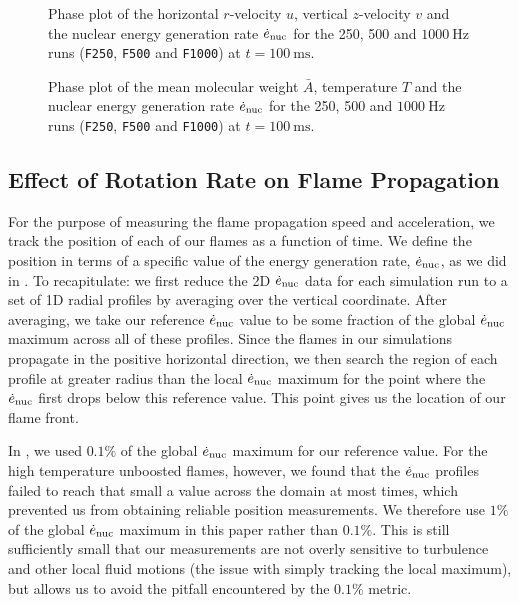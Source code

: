 \documentclass[preprint,times,tighten]{aastex63}
\newcommand{\enucdot}{\dot{e}_{\rm nuc}}
\begin{document}
\begin{figure}[t]
    \centering
    \caption{\label{fig:uv}Phase plot of the horizontal $r$-velocity $u$, vertical $z$-velocity $v$ and the nuclear energy generation rate $\dot{e}_{\rm nuc}$ for the 250, 500 and $1000~\mathrm{Hz}$ runs ({\tt F250}, {\tt F500} and {\tt F1000}) at $t = 100~\mathrm{ms}$.}
\end{figure}

\begin{figure}[t]
    \centering
    \caption{\label{fig:abar}Phase plot of the mean molecular weight $\bar{A}$, temperature $T$ and the nuclear energy generation rate $\dot{e}_{\rm nuc}$ for the 250, 500 and $1000~\mathrm{Hz}$ runs ({\tt F250}, {\tt F500} and {\tt F1000}) at $t = 100~\mathrm{ms}$.}
\end{figure}

\subsection{Effect of Rotation Rate on Flame Propagation}\label{ssec:rot_propagation}

For the purpose of measuring the flame propagation speed and acceleration, we track the position of 
each of our flames as a function of time. We define the position in terms of a specific value of 
the energy generation rate, $\enucdot$, as we did in \citet{flame_wave1}. To recapitulate: we first 
reduce the 2D $\enucdot$ data for each simulation run to a set of 1D radial profiles by averaging
over the vertical coordinate. After averaging, we take our reference $\enucdot$ value to be some 
fraction of the global $\enucdot$ maximum across all of these profiles. Since the flames in our 
simulations propagate in the positive horizontal direction, we then search the region of each profile 
at greater radius than the local $\enucdot$ maximum for the point where the $\enucdot$ first drops 
below this reference value. This point gives us the location of our flame front.

In \citet{flame_wave1}, we used $0.1\%$ of the global $\enucdot$ maximum for our reference value. 
For the high temperature unboosted flames, however, we found that the $\enucdot$ profiles failed to 
reach that small a value across the domain at most times, which prevented us from obtaining reliable 
position measurements. We therefore use $1\%$ of the global $\enucdot$ maximum in this paper
rather than $0.1\%$. This is still sufficiently small that our measurements are not overly 
sensitive to turbulence and other local fluid motions (the issue with simply tracking the local 
maximum), but allows us to avoid the pitfall encountered by the $0.1\%$ metric.
\end{document}

